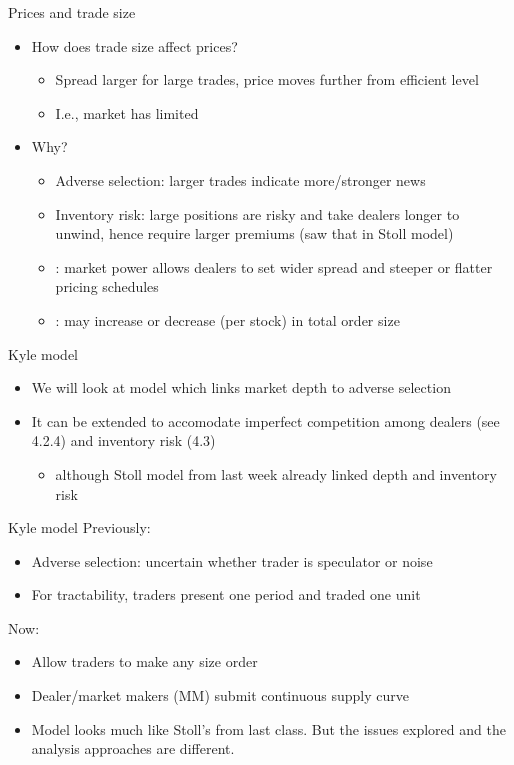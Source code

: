 \documentclass[english,10pt
,aspectratio=169
]{beamer}
\begin{document}
\begin{frame}{Prices and trade size}
	\begin{itemize}
		\item How does trade size affect prices? 
		\begin{itemize}
			\item Spread larger for large trades, price moves further from efficient level
			\item I.e., market has limited 
		\end{itemize}
		\item Why?
		\pause
		\begin{itemize}
			\item \alert{Adverse selection}: larger trades indicate more/stronger news
			\item \alert{Inventory risk}: large positions are risky and take dealers longer to unwind, hence require larger premiums (saw that in Stoll model)
			\item {}: market power allows dealers to set wider spread and steeper or flatter pricing schedules
			\pause
			\item {}: may increase or decrease (per stock) in total order size
		\end{itemize}
	\end{itemize}
\end{frame}


\begin{frame}{Kyle model}
	\begin{itemize}
		\item We will look at \cite{kyle_continuous_1985} model which links market depth to adverse selection
		\item It can be extended to accomodate imperfect competition among dealers (see 4.2.4) and inventory risk (4.3)
		\begin{itemize}
			\item although Stoll model from last week already linked depth and inventory risk
		\end{itemize}
	\end{itemize}
\end{frame}


\begin{frame}{Kyle model}
	Previously:
	\begin{itemize}
		\item Adverse selection: uncertain whether trader is speculator or noise
		\item For tractability, traders present one period and traded one unit
	\end{itemize}
	Now:
	\begin{itemize}
		\item Allow traders to make any size order
		\item Dealer/market makers (MM) submit continuous supply curve 
		\item Model looks much like Stoll's from last class. But the issues explored and the analysis approaches are different.
	\end{itemize}
\end{frame}
\end{document}
